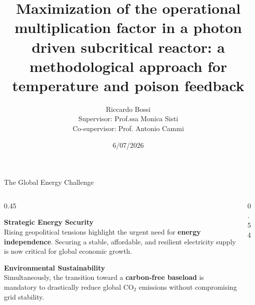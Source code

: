 \documentclass[aspectratio=169]{beamer}
\title[Optimization of an ADS]{Maximization of the operational multiplication factor in a photon driven subcritical reactor: a methodological approach for temperature and poison feedback}
\author[R. Bossi]{
  Riccardo Bossi \\ \medskip
  {\small Supervisor: Prof.ssa Monica Sisti} \\
  {\small Co-supervisor: Prof. Antonio Cammi}
}
\institute[Bicocca \& PoliMi]{University of Milano-Bicocca \\ Politecnico of Milano}
\date{6/07/2026}
\begin{document}
\begin{frame}
  \titlepage
\end{frame}


\begin{frame}{The Global Energy Challenge}

    \begin{columns}[T] %

        \begin{column}{0.45\textwidth}
            
            \textcolor{blue!80!black}{\textbf{Strategic Energy Security}} \\
            Rising geopolitical tensions highlight the urgent need for \textbf{energy independence}. Securing a stable, affordable, and resilient electricity supply is now critical for global economic growth.

            \vspace{0.3cm}
            
            \textcolor{blue!80!black}{\textbf{Environmental Sustainability}} \\
            Simultaneously, the transition toward a \textbf{carbon-free baseload} is mandatory to drastically reduce global CO$_2$ emissions without compromising grid stability.

        \end{column}
        
        \begin{column}{0.54\textwidth}
    
            \centering
\end{column}
\end{columns}
\end{frame}
\end{document}
